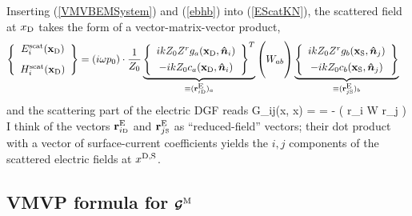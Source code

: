 \documentclass[letterpaper]{article}
\newcommand{\iD}{_{i\text{\tiny D}}}
\newcommand{\jS}{_{j\text{\tiny S}}}
\begin{document}
Inserting (\ref{VMVBEMSystem}) and (\ref{ebhb}) into
(\ref{EScatKN}), the scattered field at $x_{\text{\scriptsize D}}$
takes the form of a vector-matrix-vector product,
\begin{align}
  \left\{\begin{array}{c}
 E_i\sups{scat}(\vb x\subt{D}) \\[8pt]
 H_i\sups{scat}(\vb x\subt{D})
 \end{array}\right\}
&=(i\omega p_0) \cdot \frac{1}{Z_0}
  \underbrace{
  \left\{\begin{array}{c}
     ikZ_0 Z^r
     g_a(\vb x\subt{D}, \vbhat{n}_i) \\[4pt]
    -ikZ_0 c_a(\vb x\subt{D}, \vbhat{n}_i) 
  \end{array}\right\}^T
             }_{\equiv (\vb r\supt{E}\iD)_a}
  \left(
 \vphantom{
  \left\{\begin{array}{c} 
    ik Z_0 Z^r
     g_a(\vb x\subt{D}, \vbhat{n}_i) \\[4pt]
    -ikZ_0 c_a(\vb x\subt{D}, \vbhat{n}_i) 
  \end{array}\right\}^T
          }
         W_{ab}
  \right)
  \underbrace{
  \left\{\begin{array}{c} 
    ikZ_0 Z^r g_b(\vb x\subt{S}, \vbhat{n}_j) \\[4pt]
    -ik Z_0 c_b(\vb x\subt{S}, \vbhat{n}_j) 
  \end{array}\right\}
             }_{\equiv (\vb r\supt{E}\jS)_b}
\label{GEVMVP}
\end{align}
and the scattering part of the electric DGF reads
{
 \mc G_{ij}(\vb x, \vb x)
= 
= -
   \Big( \vb r\iD{} \cdot \vb W \cdot \vb r\jS{} \Big)
}
I think of the vectors $\vb r\supt{E}\iD$ and $\vb r\supt{E}\jS$ 
as ``reduced-field'' vectors; their dot product with a vector
of surface-current coefficients yields the $i,j$ components of 
the scattered electric fields at $x^{\text{\scriptsize D,S}}$.

\subsection*{VMVP formula for $\boldsymbol{\mathcal{G}}^{\text{\scriptsize M}}$}
\end{document}
